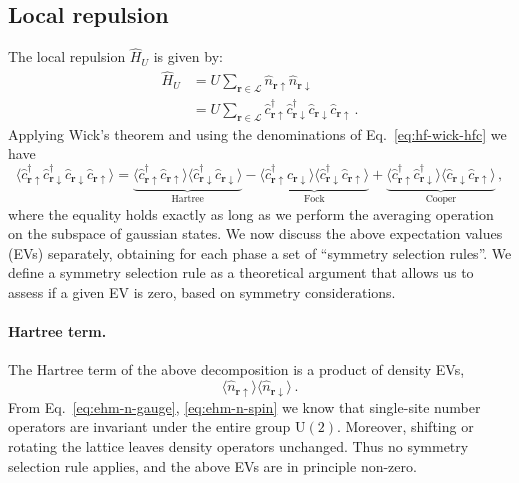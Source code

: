\subsection{Local repulsion}\label{subsec:ehm-sym-break-HU}

The local repulsion $\hat H_U$ is given by:
\[
\begin{aligned}
	\hat H_U &= U \sum_{\mathbf{r}\in\mathcal{L}} \hat n_{\mathbf{r}\uparrow} \hat n_{\mathbf{r}\downarrow} \\
	&= U \sum_{\mathbf{r}\in\mathcal{L}} \hat c_{\mathbf{r}\uparrow}^\dagger \hat c_{\mathbf{r}\downarrow}^\dagger \hat c_{\mathbf{r}\downarrow} \hat c_{\mathbf{r}\uparrow} \, .
\end{aligned}
\]
Applying Wick's theorem and using the denominations of Eq.~\eqref{eq:hf-wick-hfc} we have
\begin{equation}\label{eq:ehm-HU-wick}
	\langle
		\hat c_{\mathbf{r}\uparrow}^\dagger \hat c_{\mathbf{r}\downarrow}^\dagger \hat c_{\mathbf{r}\downarrow} \hat c_{\mathbf{r}\uparrow}
	\rangle = \underbrace{
		\langle 
		\hat c_{\mathbf{r}\uparrow}^\dagger \hat c_{\mathbf{r}\uparrow}
		\rangle \langle	
		\hat c_{\mathbf{r}\downarrow}^\dagger \hat c_{\mathbf{r}\downarrow} 
		\rangle
	}_{\text{Hartree}}
	- 
	\underbrace{
			\langle 
			\hat c_{\mathbf{r}\uparrow}^\dagger \hat c_{\mathbf{r}\downarrow}
			\rangle \langle	
			\hat c_{\mathbf{r}\downarrow}^\dagger \hat c_{\mathbf{r}\uparrow} 
			\rangle 
		}_{\text{Fock}}
	+ 
	\underbrace{
		\langle 
		\hat c_{\mathbf{r}\uparrow}^\dagger \hat c_{\mathbf{r}\downarrow}^\dagger
		\rangle \langle	
		\hat c_{\mathbf{r}\downarrow} \hat c_{\mathbf{r}\uparrow} 
		\rangle 
	}_{\text{Cooper}} \, ,
\end{equation}
where the equality holds exactly as long as we perform the averaging operation on the subspace of gaussian states. We now discuss the above expectation values (EVs) separately, obtaining for each phase a set of ``symmetry selection rules''.  We define a symmetry selection rule as a theoretical argument that allows us to assess if a given EV is zero, based on symmetry considerations.

\paragraph{Hartree term.} The Hartree term of the above decomposition is a product of density EVs,
\[
	\langle 
		\hat n_{\mathbf{r}\uparrow}
	\rangle \langle	
		\hat n_{\mathbf{r}\downarrow}
	\rangle \, .
\]
From Eq.~\eqref{eq:ehm-n-gauge}, \eqref{eq:ehm-n-spin} we know that  single-site number operators are invariant under the entire group $\mathrm{U}(2)$. Moreover, shifting or rotating the lattice leaves density operators unchanged. Thus no symmetry selection rule applies, and the above EVs are in principle non-zero.

